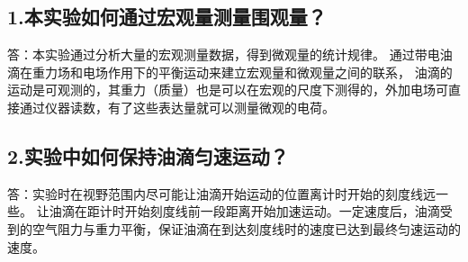 \documentclass[12pt,a4paper,UTF8]{ctexart}
\begin{document}
\subsection*{1.本实验如何通过宏观量测量围观量？}
答：本实验通过分析大量的宏观测量数据，得到微观量的统计规律。
通过带电油滴在重力场和电场作用下的平衡运动来建立宏观量和微观量之间的联系，
油滴的运动是可观测的，其重力（质量）也是可以在宏观的尺度下测得的，外加电场可直接通过仪器读数，有了这些表达量就可以测量微观的电荷。
\subsection*{2.实验中如何保持油滴匀速运动？}
答：实验时在视野范围内尽可能让油滴开始运动的位置离计时开始的刻度线远一些。
让油滴在距计时开始刻度线前一段距离开始加速运动。一定速度后，油滴受到的空气阻力与重力平衡，保证油滴在到达刻度线时的速度已达到最终匀速运动的速度。
\end{document}
